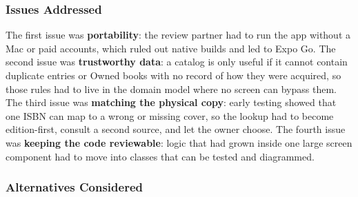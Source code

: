 \documentclass[12pt]{article}
\begin{document}
\subsubsection{Issues Addressed}

The first issue was \textbf{portability}: the review partner had to run the app without a Mac or paid accounts, which ruled out native builds and led to Expo Go. The second issue was \textbf{trustworthy data}: a catalog is only useful if it cannot contain duplicate entries or Owned books with no record of how they were acquired, so those rules had to live in the domain model where no screen can bypass them. The third issue was \textbf{matching the physical copy}: early testing showed that one ISBN can map to a wrong or missing cover, so the lookup had to become edition-first, consult a second source, and let the owner choose. The fourth issue was \textbf{keeping the code reviewable}: logic that had grown inside one large screen component had to move into classes that can be tested and diagrammed.

\subsubsection{Alternatives Considered}
\end{document}
